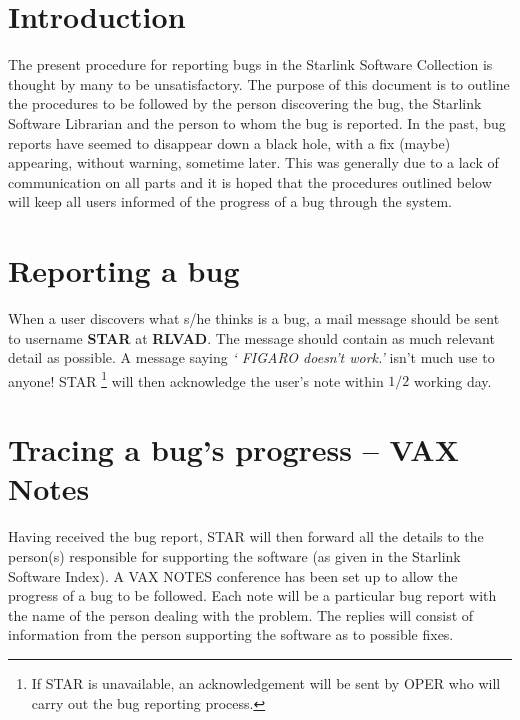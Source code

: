 \documentclass[twoside,11pt]{article}
\newcommand{\stardocinitials}  {SGP}
\newcommand{\stardocnumber}    {1.1}
\newcommand{\stardocname}{\stardocinitials /\stardocnumber}
\newenvironment{latexonly}{}{}
\begin{document}

\section{Introduction}
The present procedure for reporting bugs in the Starlink Software Collection is
thought by many to be unsatisfactory. The purpose of this document is to outline
the procedures to be followed by the person discovering the bug, the Starlink
Software Librarian and the person to whom the bug is reported. In the past,
bug reports have seemed to disappear down a black hole, with a fix (maybe)
appearing, without warning, sometime later. This was generally due to a lack of
communication on all parts and it is hoped that the procedures outlined below
will keep all users informed of the progress of a bug through the system.

\section{Reporting a bug}
When a user discovers what s/he thinks is a bug, a mail message should be
sent to username {\bf STAR} at {\bf RLVAD}. The message should contain as much
relevant detail as possible. A message saying {\it ` FIGARO doesn't work.'}
isn't much use to anyone! STAR \footnote[1]{If STAR is unavailable, an
acknowledgement will be sent by OPER who will carry out the bug reporting
process.} will then acknowledge the user's note within $1/2$ working day.

\section{Tracing a bug's progress -- VAX Notes}
Having received the bug report, STAR will then forward all the details to the
person(s) responsible for supporting the software (as given in the Starlink
Software Index). A VAX NOTES conference has been set up to allow the
progress of a bug to be followed. Each note will be a particular
bug report
with the name of the person dealing with the problem. The replies will consist
of information from the person supporting the software as to possible fixes.
\end{document}
